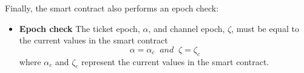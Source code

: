 Finally, the smart contract also performs an epoch check:
\begin{itemize}
    \item
          \textbf{Epoch check} The ticket epoch, $\alpha$, and channel epoch, $\zeta$, must be equal to the current values in the smart contract $$\alpha=\alpha_c \;\; and \;\; \zeta=\zeta_c$$ where $\alpha_c$ and $\zeta_c$ represent the current values in the smart contract.
\end{itemize}
